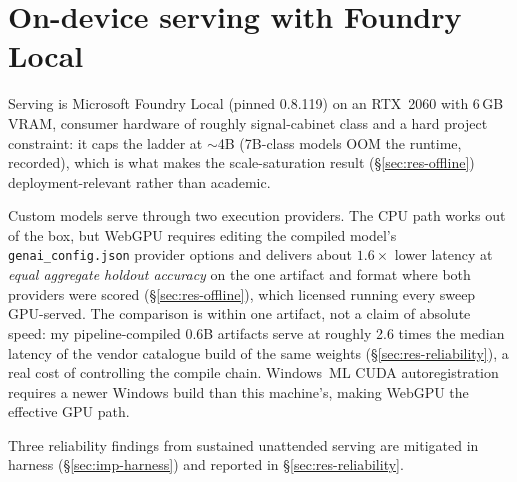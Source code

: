 \section{On-device serving with Foundry Local}\label{sec:imp-foundry}
Serving is Microsoft Foundry Local (pinned 0.8.119) on an RTX~2060 with
6\,GB VRAM, consumer hardware of roughly signal-cabinet class and a hard
project constraint: it caps the ladder at
$\sim$4B (7B-class models OOM the runtime, recorded), which is what makes
the scale-saturation result (\S\ref{sec:res-offline}) deployment-relevant
rather than academic.

Custom models serve through two execution providers. The CPU path works
out of the box, but WebGPU requires editing the compiled model's
\texttt{genai\_config.json} provider options and delivers about
$1.6\times$ lower latency at \emph{equal aggregate holdout accuracy} on the
one artifact and format where both providers were scored
(\S\ref{sec:res-offline}), which
licensed running every sweep GPU-served. The comparison is within one
artifact, not a claim of absolute speed: my
pipeline-compiled 0.6B artifacts serve at roughly 2.6 times the median
latency of the vendor catalogue build of the same weights
(\S\ref{sec:res-reliability}), a real cost of controlling the compile
chain. Windows~ML CUDA
autoregistration requires a newer Windows build than this machine's,
making WebGPU the effective GPU path.

Three reliability findings from sustained unattended serving are
mitigated in harness (\S\ref{sec:imp-harness}) and reported in
\S\ref{sec:res-reliability}.

